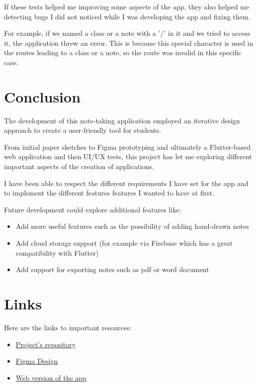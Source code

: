 \documentclass[]{article}
\begin{document}
	\pagebreak
	
	If these tests helped me improving some aspects of the app, they also helped me detecting bugs I did not noticed while I was developing the app and fixing them.\linebreak
	
	For example, if we named a class or a note with a '/' in it and we tried to access it, the application threw an error. This is because this special character is used in the routes leading to a class or a note, so the route was invalid in this specific case.
	
	\pagebreak
	
	\section{Conclusion}
	
	The development of this note-taking application employed an iterative design approach to create a user-friendly tool for students.\linebreak
	
	From initial paper sketches to Figma prototyping and ultimately a Flutter-based web application and then UI/UX tests, this project has let me exploring different important aspects of the creation of applications.\linebreak
	
	I have been able to respect the different requirements I have set for the app and to implement the different features features I wanted to have at first.\linebreak
	
	Future development could explore additional features like:
	
	\begin{itemize}
		\item Add more useful features such as the possibility of adding hand-drawn notes
		\item Add cloud storage support (for example via Firebase which has a great compatibility with Flutter)
		\item Add support for exporting notes such as pdf or word document
	\end{itemize}
	
	\pagebreak
	
	\section{Links}
	
	Here are the links to important resources:
	
	\begin{itemize}
		\item \href{https://github.com/Logan-Developer/ui-lahumbert/tree/main/FinalProject}{Project's repository} 
		
		\item \href{https://www.figma.com/file/ZOlxVGHb9fLdk5uUODqMU9/CSCI-337---Notes-Taking-App?type=design&node-id=54810%3A34721&mode=design&t=fS6KJvRgsvtgz9cf-1}{Figma Design}
		
		\item
		\href{https://class-snap.tech/}{Web version of the app}
	\end{itemize}
	
	\label{LastPage}
\end{document}
